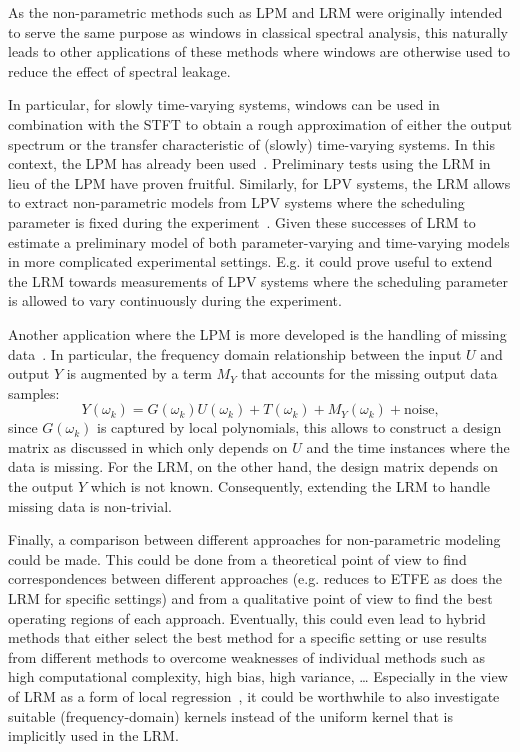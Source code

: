     As the non-parametric methods such as \gls{LPM} and \gls{LRM} were originally intended to serve the same purpose as windows in classical spectral analysis, this naturally leads to other applications of these methods where windows are otherwise used to reduce the effect of spectral leakage.

    In particular, for slowly time-varying systems, windows can be used in combination with the \gls{STFT} to obtain a rough approximation of either the output spectrum or the transfer characteristic of (slowly) time-varying systems.
    In this context, the \gls{LPM} has already been used~\citep{Lataire2012}.
    Preliminary tests using the \gls{LRM} in lieu of the \gls{LPM} have proven fruitful.
    Similarly, for \gls{LPV} systems, the \gls{LRM} allows to extract non-parametric models from \gls{LPV} systems where the scheduling parameter is fixed during the experiment~\citep[Chapter 4]{vanderMaas2016PhD}.
    Given these successes of \gls{LRM} to estimate a preliminary model of both parameter-varying and time-varying models in more complicated experimental settings.
    E.g. it could prove useful to extend the \gls{LRM} towards measurements of \gls{LPV} systems where the scheduling parameter is allowed to vary continuously during the experiment.

    Another application where the \gls{LPM} is more developed is the handling of missing data~\citep{Ugryumova2015}.
    In particular, the frequency domain relationship between the input $U$ and output $Y$ is augmented by a term $M_Y$ that accounts for the missing output data samples:
    \begin{equation}
      Y(\omega_k) = G(\omega_k) U(\omega_k) + T(\omega_k) + M_Y(\omega_k) + \mathrm{noise}\text{,}
    \end{equation}
    since $G(\omega_k)$ is captured by local polynomials, this allows to construct a design matrix as discussed in  which only depends on $U$ and the time instances where the data is missing.
    For the \gls{LRM}, on the other hand, the design matrix depends on the output $Y$ which is not known.
    Consequently, extending the \gls{LRM} to handle missing data is non-trivial.

    Finally, a comparison between different approaches for non-parametric modeling~\citep{Hagg2012,Stenman2001ASFRF,Gevers2011lpm} could be made.
    This could be done from a theoretical point of view to find correspondences between different approaches (e.g. \citep{Hagg2012} reduces to \gls{ETFE} as does the \gls{LRM} for specific settings) and from a qualitative point of view to find the best operating regions of each approach.
    Eventually, this could even lead to hybrid methods that either select the best method for a specific setting or use results from different methods to overcome weaknesses of individual methods such as high computational complexity, high bias, high variance, \ldots
    Especially in the view of \gls{LRM} as a form of local regression~\citep{Loader1999}, it could be worthwhile to also investigate suitable (frequency-domain) kernels instead of the uniform kernel that is implicitly used in the \gls{LRM}.

